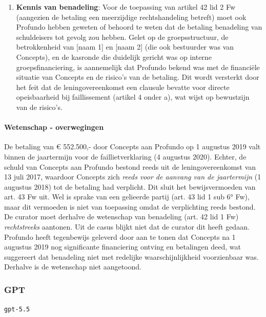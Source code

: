 \documentclass[
  dutch,
  a4paper,
]{article}
\begin{document}
\begin{enumerate}
\item
  \textbf{Kennis van benadeling}: Voor de toepassing van artikel 42 lid 2 Fw (aangezien de betaling een meerzijdige rechtshandeling betreft) moet ook Profundo hebben geweten of behoord te weten dat de betaling benadeling van schuldeisers tot gevolg zou hebben. Gelet op de groepsstructuur, de betrokkenheid van {[}naam 1{]} en {[}naam 2{]} (die ook bestuurder was van Concepts), en de kasronde die duidelijk gericht was op interne groepsfinanciering, is aannemelijk dat Profundo bekend was met de financiële situatie van Concepts en de risico's van de betaling. Dit wordt versterkt door het feit dat de leningovereenkomst een clausule bevatte voor directe opeisbaarheid bij faillissement (artikel 4 onder a), wat wijst op bewustzijn van de risico's.
\end{enumerate}

\paragraph{Wetenschap - overwegingen}\label{wetenschap---overwegingen-36}

De betaling van € 552.500,- door Concepts aan Profundo op 1 augustus 2019 valt binnen de jaartermijn voor de faillietverklaring (4 augustus 2020). Echter, de schuld van Concepts aan Profundo bestond reeds uit de leningovereenkomst van 13 juli 2017, waardoor Concepts zich \emph{reeds voor de aanvang van de jaartermijn} (1 augustus 2018) tot de betaling had verplicht. Dit sluit het bewijsvermoeden van art. 43 Fw uit. Wel is sprake van een gelieerde partij (art. 43 lid 1 sub 6° Fw), maar dit vermoeden is niet van toepassing omdat de verplichting reeds bestond. De curator moet derhalve de wetenschap van benadeling (art. 42 lid 1 Fw) \emph{rechtstreeks} aantonen. Uit de casus blijkt niet dat de curator dit heeft gedaan. Profundo heeft tegenbewijs geleverd door aan te tonen dat Concepts na 1 augustus 2019 nog significante financiering ontving en betalingen deed, wat suggereert dat benadeling niet met redelijke waarschijnlijkheid voorzienbaar was. Derhalve is de wetenschap niet aangetoond.

\newpage


\subsubsection{GPT}\label{gpt-12}

\texttt{gpt-5.5}
\end{document}
